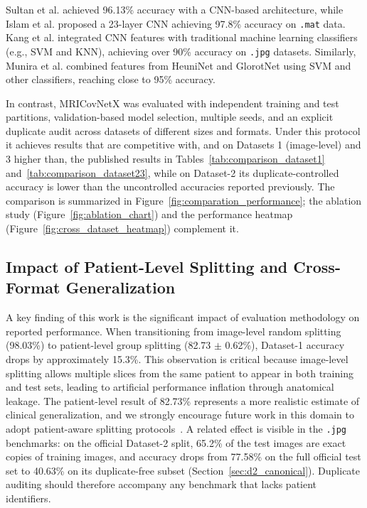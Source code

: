 \documentclass[a4paper,fleqn]{cas-sc}
\begin{document}
Sultan et al. \cite{R2} achieved 96.13\% accuracy with a CNN-based architecture, while Islam et al. \cite{R25} proposed a 23-layer CNN achieving 97.8\% accuracy on \texttt{.mat} data. Kang et al. \cite{R37} integrated CNN features with traditional machine learning classifiers (e.g., SVM and KNN), achieving over 90\% accuracy on \texttt{.jpg} datasets. Similarly, Munira et al. \cite{R28} combined features from HeuniNet and GlorotNet using SVM and other classifiers, reaching close to 95\% accuracy.

In contrast, MRICovNetX was evaluated with independent training and test partitions, validation-based model selection, multiple seeds, and an explicit duplicate audit across datasets of different sizes and formats. Under this protocol it achieves results that are competitive with, and on Datasets 1 (image-level) and 3 higher than, the published results in Tables~\ref{tab:comparison_dataset1} and~\ref{tab:comparison_dataset23}, while on Dataset-2 its duplicate-controlled accuracy is lower than the uncontrolled accuracies reported previously. The comparison is summarized in Figure~\ref{fig:comparation_performance}; the ablation study (Figure~\ref{fig:ablation_chart}) and the performance heatmap (Figure~\ref{fig:cross_dataset_heatmap}) complement it.

\subsection{Impact of Patient-Level Splitting and Cross-Format Generalization}

A key finding of this work is the significant impact of evaluation methodology on reported performance. When transitioning from image-level random splitting (98.03\%) to patient-level group splitting (82.73 $\pm$ 0.62\%), Dataset-1 accuracy drops by approximately 15.3\%. This observation is critical because image-level splitting allows multiple slices from the same patient to appear in both training and test sets, leading to artificial performance inflation through anatomical leakage. The patient-level result of 82.73\% represents a more realistic estimate of clinical generalization, and we strongly encourage future work in this domain to adopt patient-aware splitting protocols~\cite{R_Rudin2019}. A related effect is visible in the \texttt{.jpg} benchmarks: on the official Dataset-2 split, 65.2\% of the test images are exact copies of training images, and accuracy drops from 77.58\% on the full official test set to 40.63\% on its duplicate-free subset (Section~\ref{sec:d2_canonical}). Duplicate auditing should therefore accompany any benchmark that lacks patient identifiers.
\end{document}
